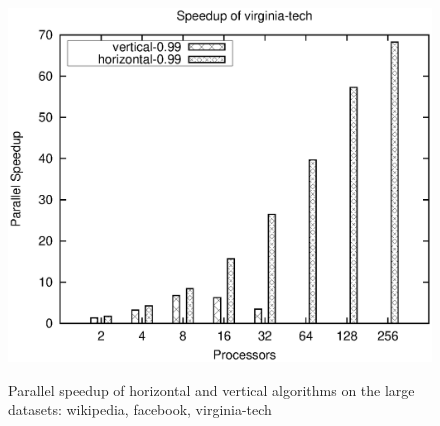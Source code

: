 \documentclass{comjnl}
\begin{document}
\begin{figure}[!htb]
\begin{center}
{      \includegraphics[scale=0.435]{../perf/benchmark-new.ulakbim/virginia-tech.speedup.ps}
    }
    \caption{Parallel speedup of horizontal and vertical algorithms on
      the large datasets: wikipedia, facebook, virginia-tech}
    \label{fig:speedup-large}
  \end{center}
\end{figure}
\end{document}
